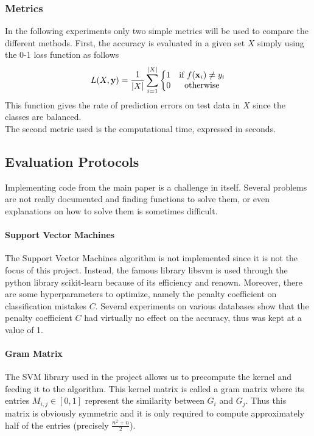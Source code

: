 \documentclass{article}
\DeclarePairedDelimiter{\abs}{\lvert}{\rvert}
\let\vec\mathbf
\theoremstyle{definition}
\begin{document}
\subsubsection{Metrics}
In the following experiments only two simple metrics will be used to compare the different methods. First, the accuracy is evaluated in a given set $X$ simply using the 0-1 loss function as follows
\begin{equation}
L(X,\vec{y})=\frac{1}{\abs{X}}\sum\limits_{i=1}^{\abs{X}}\left\{
\begin{matrix}
1 & \mbox{if } f(\vec{x}_i) \neq y_i \\
0 & \mbox{otherwise}
\end{matrix}
\right.
\end{equation}
This function gives the rate of prediction errors on test data in $X$ since the classes are balanced.\\
The second metric used is the computational time, expressed in seconds. 
\subsection{Evaluation Protocols}
Implementing code from the main paper is a challenge in itself. Several problems are not really documented and finding functions to solve them, or even explanations on how to solve them is sometimes difficult.
\paragraph{Support Vector Machines}
The Support Vector Machines algorithm is not implemented since it is not the focus of this project. Instead, the famous library libsvm\cite{cc2011libsvm} is used through the python library scikit-learn\cite{pedregosa2011scikit} because of its efficiency and renown. Moreover, there are some hyperparameters to optimize, namely the penalty coefficient on classification mistakes $C$. Several experiments on various databases show that the penalty coefficient $C$ had virtually no effect on the accuracy, thus was kept at a value of 1.
\paragraph{Gram Matrix}
The SVM library used in the project allows us to precompute the kernel and feeding it to the algorithm. This kernel matrix is called a gram matrix where its entries $M_{i,j}\in [0,1]$ represent the similarity between $G_i$ and $G_j$. Thus this matrix is obviously symmetric and it is only required to compute approximately half of the entries (precisely $\frac{n^2+n}{2}$).
\end{document}
